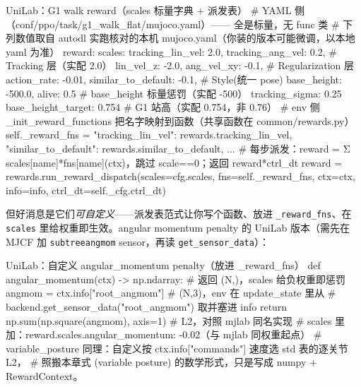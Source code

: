 \begin{codebox}[Python]{UniLab：G1 walk reward（scales 标量字典 $+$ 派发表）}
# YAML 侧（conf/ppo/task/g1_walk_flat/mujoco.yaml）—— 全是标量，无 func 类
# 下列数值取自 autodl 实跑核对的本机 mujoco.yaml（你装的版本可能微调，以本地 yaml 为准）
reward:
  scales: {tracking_lin_vel: 2.0, tracking_ang_vel: 0.2,   # Tracking 层（实配 2.0）
           lin_vel_z: -2.0, ang_vel_xy: -0.1,              # Regularization 层
           action_rate: -0.01, similar_to_default: -0.1,   # Style(统一 pose)
           base_height: -500.0, alive: 0.5}                # base_height 标量惩罚（实配 -500）
  tracking_sigma: 0.25
  base_height_target: 0.754                                # G1 站高（实配 0.754，非 0.76）
# env 侧 _init_reward_functions 把名字映射到函数（共享函数在 common/rewards.py）
self._reward_fns = {"tracking_lin_vel": rewards.tracking_lin_vel,
                    "similar_to_default": rewards.similar_to_default, ...}
# 每步派发：reward = Σ scales[name]*fns[name](ctx)，跳过 scale==0；返回 reward*ctrl_dt
reward = rewards.run_reward_dispatch(scales=cfg.scales, fns=self._reward_fns,
                                     ctx=ctx, info=info, ctrl_dt=self._cfg.ctrl_dt)
\end{codebox}

但好消息是它们\emph{可自定义}——派发表范式让你写个函数、放进 \texttt{\_reward\_fns}、在 \texttt{scales} 里给权重即生效。angular momentum penalty 的 UniLab 版本（需先在 MJCF 加 \texttt{subtreeangmom} sensor，再读 \texttt{get\_sensor\_data}）：

\begin{codebox}[Python]{UniLab：自定义 angular\_momentum penalty（放进 \_reward\_fns）}
def angular_momentum(ctx) -> np.ndarray:        # 返回 (N,)，scales 给负权重即惩罚
    angmom = ctx.info["root_angmom"]            # (N,3)，env 在 update_state 里从
                                                # backend.get_sensor_data("root_angmom") 取并塞进 info
    return np.sum(np.square(angmom), axis=1)    # L2，对照 mjlab 同名实现
# scales 里加：reward.scales.angular_momentum: -0.02（与 mjlab 同权重起点）
# variable_posture 同理：自定义按 ctx.info["commands"] 速度选 std 表的逐关节 L2，
#   照搬本章式 (variable posture) 的数学形式，只是写成 numpy + RewardContext。
\end{codebox}

